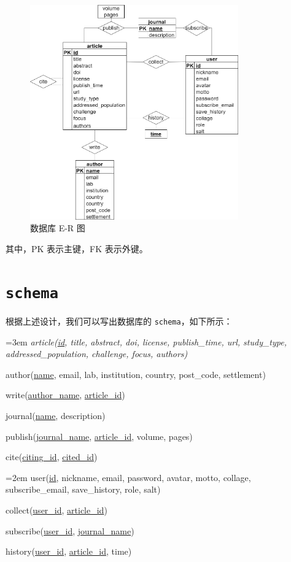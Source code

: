 \documentclass[UTF8,openany]{ctexbook}
\begin{document}
\begin{figure}[H]
    \centering
    \includegraphics[width=0.8\textwidth]{img/ER.png}
    \caption{数据库 E-R 图}
    \label{fig:er}
\end{figure}

其中，PK 表示主键，FK 表示外键。

\section{\texttt{schema}}
\label{sec:schema}

根据上述设计，我们可以写出数据库的 \texttt{schema}，如下所示：

\begin{tcolorbox}
    \raggedright
    \hangindent=3em
    \it
    article(\uline{id}, title, abstract, doi, license, publish\_time, url, study\_type, addressed\_population,
    challenge, focus, authors)

    author(\uline{name}, email, lab, institution, country, post\_code, settlement)

    write(\uline{author\_name}, \uline{article\_id})

    journal(\uline{name}, description)

    publish(\uline{journal\_name}, \uline{article\_id}, volume, pages)

    cite(\uline{citing\_id}, \uline{cited\_id})

    \hangindent=2em
    user(\uline{id}, nickname, email, password, avatar, motto, collage, subscribe\_email, save\_history, role, salt)

    collect(\uline{user\_id}, \uline{article\_id})

    subscribe(\uline{user\_id}, \uline{journal\_name})

    history(\uline{user\_id}, \uline{article\_id}, time)
\end{tcolorbox}
\end{document}
